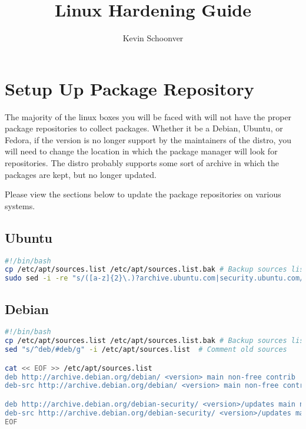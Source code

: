 \documentclass{article}
\title{\textbf{Linux Hardening Guide}}
\author{Kevin Schoonver}
\begin{document}
\maketitle

\tableofcontents 

\pagebreak 

\section{Setup Up Package Repository}
The majority of the linux boxes you will be faced with will not have the proper
package repositories to collect packages. Whether it be a Debian, Ubuntu, or
Fedora, if the version is no longer support by the maintainers of the distro,
you will need to change the location in which the package manager will look for
repositories. The distro probably supports some sort of archive in which the
packages are kept, but no longer updated. 

Please view the sections below to update the package repositories on various
systems.

\subsection{Ubuntu}
\begin{lstlisting}[language=bash]
#!/bin/bash
cp /etc/apt/sources.list /etc/apt/sources.list.bak # Backup sources list
sudo sed -i -re "s/([a-z]{2}\.)?archive.ubuntu.com|security.ubuntu.com/old-releases.ubuntu.com/g" /etc/apt/sources.list
\end{lstlisting}

\subsection{Debian}
\begin{lstlisting}[language=bash]
#!/bin/bash
cp /etc/apt/sources.list /etc/apt/sources.list.bak # Backup sources list
sed "s/^deb/#deb/g" -i /etc/apt/sources.list  # Comment old sources

cat << EOF >> /etc/apt/sources.list
deb http://archive.debian.org/debian/ <version> main non-free contrib
deb-src http://archive.debian.org/debian/ <version> main non-free contrib

deb http://archive.debian.org/debian-security/ <version>/updates main non-free contrib
deb-src http://archive.debian.org/debian-security/ <version>/updates main non-free contrib
EOF
\end{lstlisting}
\end{document}
